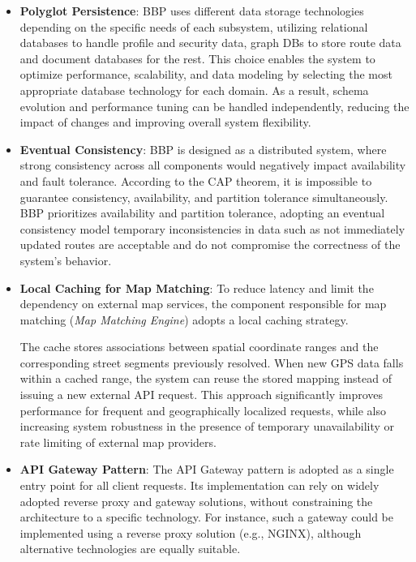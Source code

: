 \begin{itemize}
    \item \textbf{Polyglot Persistence}:  
    BBP uses  different data storage technologies depending on the specific needs of each subsystem, utilizing relational databases to handle profile and security data, graph DBs to store route data and document databases for the rest. This choice enables the system to optimize performance, scalability, and data modeling by selecting the most appropriate database technology for each domain. As a result, schema evolution and performance tuning can be handled independently, reducing the impact of changes and improving overall system flexibility.

    \item \textbf{Eventual Consistency}:  
    BBP is designed as a distributed system, where strong consistency across all components would negatively impact availability and fault tolerance. According to the CAP theorem, it is impossible to guarantee consistency, availability, and partition tolerance simultaneously. BBP prioritizes availability and partition tolerance, adopting an eventual consistency model temporary inconsistencies in data such as not immediately updated routes are acceptable and do not compromise the correctness of the system’s behavior.

    \item \textbf{Local Caching for Map Matching}:
    To reduce latency and limit the dependency on external map services, the component responsible for map matching (\textit{Map Matching Engine}) adopts a local caching strategy.

    The cache stores associations between spatial coordinate ranges and the corresponding street segments previously resolved. When new GPS data falls within a cached range, the system can reuse the stored mapping instead of issuing a new external API request.
    This approach significantly improves performance for frequent and geographically localized requests, while also increasing system robustness in the presence of temporary unavailability or rate limiting of external map providers.


    \item \textbf{API Gateway Pattern}:  
    The API Gateway pattern is adopted as a single entry point for all client requests.
    Its implementation can rely on widely adopted reverse proxy and gateway solutions, without constraining the architecture to a specific technology.
    For instance, such a gateway could be implemented using a reverse proxy solution (e.g., NGINX), although alternative technologies are equally suitable.


\end{itemize}

